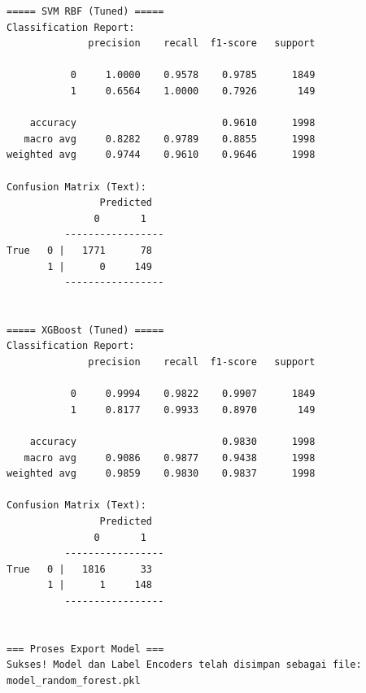 \begin{lstlisting}[caption={Output 12}]
===== SVM RBF (Tuned) =====
Classification Report:
              precision    recall  f1-score   support

           0     1.0000    0.9578    0.9785      1849
           1     0.6564    1.0000    0.7926       149

    accuracy                         0.9610      1998
   macro avg     0.8282    0.9789    0.8855      1998
weighted avg     0.9744    0.9610    0.9646      1998

Confusion Matrix (Text):
                Predicted
               0       1
          -----------------
True   0 |   1771      78
       1 |      0     149
          -----------------


===== XGBoost (Tuned) =====
Classification Report:
              precision    recall  f1-score   support

           0     0.9994    0.9822    0.9907      1849
           1     0.8177    0.9933    0.8970       149

    accuracy                         0.9830      1998
   macro avg     0.9086    0.9877    0.9438      1998
weighted avg     0.9859    0.9830    0.9837      1998

Confusion Matrix (Text):
                Predicted
               0       1
          -----------------
True   0 |   1816      33
       1 |      1     148
          -----------------


=== Proses Export Model ===
Sukses! Model dan Label Encoders telah disimpan sebagai file: model_random_forest.pkl
\end{lstlisting}

